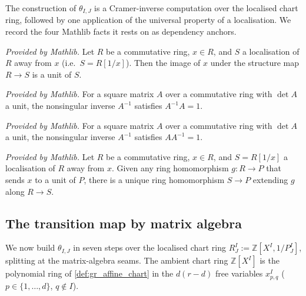 The construction of \(\theta_{I,J}\) is a Cramer-inverse computation over the
localised chart ring, followed by one application of the universal property of a
localisation. We record the four Mathlib facts it rests on as dependency
anchors.

\begin{lemma}
  \label{lem:mathlib_away_algebraMap_isUnit}
  \mathlibok
  \textit{Provided by Mathlib.}
  Let \(R\) be a commutative ring, \(x \in R\), and \(S\) a localisation of \(R\)
  away from \(x\) (i.e.\ \(S = R[1/x]\)). Then the image of \(x\) under the
  structure map \(R \to S\) is a unit of \(S\).
\end{lemma}

\begin{lemma}
  \label{lem:mathlib_nonsing_inv_mul}
  \mathlibok
  \textit{Provided by Mathlib.}
  For a square matrix \(A\) over a commutative ring with \(\det A\) a unit, the
  nonsingular inverse \(A^{-1}\) satisfies \(A^{-1} A = 1\).
\end{lemma}

\begin{lemma}
  \label{lem:mathlib_mul_nonsing_inv}
  \mathlibok
  \textit{Provided by Mathlib.}
  For a square matrix \(A\) over a commutative ring with \(\det A\) a unit, the
  nonsingular inverse \(A^{-1}\) satisfies \(A A^{-1} = 1\).
\end{lemma}

\begin{lemma}
  \label{lem:mathlib_away_lift}
  \mathlibok
  \textit{Provided by Mathlib.}
  Let \(R\) be a commutative ring, \(x \in R\), and \(S = R[1/x]\) a localisation
  of \(R\) away from \(x\). Given any ring homomorphism \(g : R \to P\) that
  sends \(x\) to a unit of \(P\), there is a unique ring homomorphism
  \(S \to P\) extending \(g\) along \(R \to S\).
\end{lemma}

\subsection*{The transition map by matrix algebra}

We now build \(\theta_{I,J}\) in seven steps over the localised chart ring
\(R^I_J := \mathbb{Z}[X^I, 1/P^I_J]\), splitting at the matrix-algebra seams. The
ambient chart ring \(\mathbb{Z}[X^I]\) is the polynomial ring of
\cref{def:gr_affine_chart} in the \(d(r-d)\) free variables \(x^I_{p,q}\)
(\(p \in \{1,\dots,d\}\), \(q \notin I\)).

